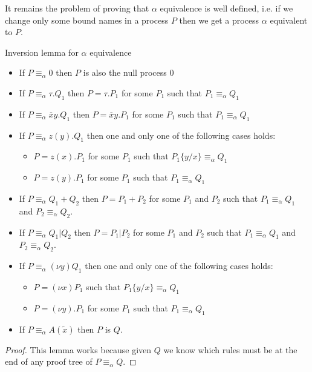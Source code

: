 It remains the problem of proving that $\alpha$ equivalence is well defined, i.e. if we change only some bound names in a process $P$ then we get a process $\alpha$ equivalent to $P$. 

\begin{lemma}
  Inversion lemma for $\alpha$ equivalence
  \begin{itemize}
    \item 	
      If $P\equiv_{\alpha}0$ then $P$ is also the null process $0$
    \item
      If $P\equiv_{\alpha} \tau.Q_{1}$ then $P=\tau.P_{1}$ for some $P_{1}$ such that $P_{1}\equiv_{\alpha}Q_{1}$
    \item
      If $P\equiv_{\alpha} \overline{x}y.Q_{1}$ then $P=\overline{x}y.P_{1}$ for some $P_{1}$ such that $P_{1}\equiv_{\alpha}Q_{1}$
    \item
      If $P\equiv_{\alpha} z(y).Q_{1}$ then one and only one of the following cases holds:
      \begin{itemize}
	\item 
	  $P=z(x).P_{1}$ for some $P_{1}$ such that $P_{1}\{y/x\}\equiv_{\alpha}Q_{1}$
	\item
	  $P=z(y).P_{1}$ for some $P_{1}$ such that $P_{1}\equiv_{\alpha}Q_{1}$
      \end{itemize}
    \item
      If $P\equiv_{\alpha} Q_{1}+Q_{2}$ then $P=P_{1}+P_{2}$ for some $P_{1}$ and $P_{2}$ such that $P_{1}\equiv_{\alpha}Q_{1}$ and $P_{2}\equiv_{\alpha}Q_{2}$.
    \item 
      If $P\equiv_{\alpha} Q_{1}|Q_{2}$ then $P=P_{1}|P_{2}$ for some $P_{1}$ and $P_{2}$ such that $P_{1}\equiv_{\alpha}Q_{1}$ and $P_{2}\equiv_{\alpha}Q_{2}$.
    \item 
      If $P\equiv_{\alpha} (\nu y)Q_{1}$ then one and only one of the following cases holds:
      \begin{itemize}
	\item
	  $P=(\nu x)P_{1}$ such that $P_{1}\{y/x\}\equiv_{\alpha}Q_{1}$
	\item
	  $P=(\nu y).P_{1}$ for some $P_{1}$ such that $P_{1}\equiv_{\alpha}Q_{1}$
      \end{itemize}
    \item 
      If $P\equiv_{\alpha} A(\tilde{x})$ then $P$ is $Q$.
  \end{itemize}
    \begin{proof}
      This lemma works because given $Q$ we know which rules must be at the end of any proof tree of $P\equiv_{\alpha}Q$.
    \end{proof}
\end{lemma}

